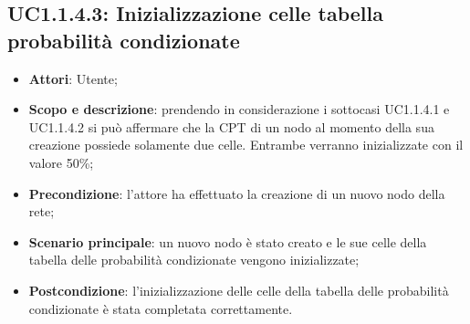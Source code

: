 \subsection{UC1.1.4.3: Inizializzazione celle tabella probabilità condizionate} 
\hypertarget{UC1.1.4.3}{} 
\begin{itemize} 
	\item{\textbf{Attori}: Utente;} 
	\item{\textbf{Scopo e descrizione}: prendendo in considerazione i sottocasi UC1.1.4.1 e UC1.1.4.2 si può affermare che la CPT di un nodo al momento della sua creazione possiede solamente due celle. Entrambe verranno inizializzate con il valore 50\%;} 
	\item{\textbf{Precondizione}: l'attore ha effettuato la creazione di un nuovo nodo della rete;}
	\item{\textbf{Scenario principale}: un nuovo nodo è stato creato e le sue celle della tabella delle probabilità condizionate vengono inizializzate;} 
	\item{\textbf{Postcondizione}: l'inizializzazione delle celle della tabella delle probabilità condizionate è stata completata correttamente.} 
\end{itemize} 
